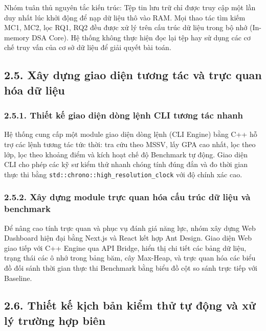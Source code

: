 \documentclass[14pt,a4paper]{extarticle}
\begin{document}
Nhóm tuân thủ nguyên tắc kiến trúc: Tệp tin lưu trữ chỉ được truy cập một lần duy nhất lúc khởi động để nạp dữ liệu thô vào RAM. Mọi thao tác tìm kiếm MC1, MC2, lọc RQ1, RQ2 đều được xử lý trên cấu trúc dữ liệu trong bộ nhớ (In-memory DSA Core). Hệ thống không thực hiện đọc lại tệp hay sử dụng các cơ chế truy vấn của cơ sở dữ liệu để giải quyết bài toán.

\subsection*{2.5. Xây dựng giao diện tương tác và trực quan hóa dữ liệu}
{}

\subsubsection*{2.5.1. Thiết kế giao diện dòng lệnh CLI tương tác nhanh}
{}

Hệ thống cung cấp một module giao diện dòng lệnh (CLI Engine) bằng C++ hỗ trợ các lệnh tương tác tức thời: tra cứu theo MSSV, lấy GPA cao nhất, lọc theo lớp, lọc theo khoảng điểm và kích hoạt chế độ Benchmark tự động. Giao diện CLI cho phép các kỹ sư kiểm thử nhanh chóng tính đúng đắn và đo thời gian thực thi bằng \texttt{std::}\allowbreak\texttt{chrono::}\allowbreak\texttt{high\_}\allowbreak\texttt{resolution\_clock} với độ chính xác cao.

\subsubsection*{2.5.2. Xây dựng module trực quan hóa cấu trúc dữ liệu và benchmark}
{}

Để nâng cao tính trực quan và phục vụ đánh giá năng lực, nhóm xây dựng Web Dashboard hiện đại bằng Next.js và React kết hợp Ant Design. Giao diện Web giao tiếp với C++ Engine qua API Bridge, hiển thị chi tiết các bảng dữ liệu, trạng thái các ô nhớ trong bảng băm, cây Max-Heap, và trực quan hóa các biểu đồ đối sánh thời gian thực thi Benchmark bằng biểu đồ cột so sánh trực tiếp với Baseline.

\subsection*{2.6. Thiết kế kịch bản kiểm thử tự động và xử lý trường hợp biên}
{}
\end{document}
